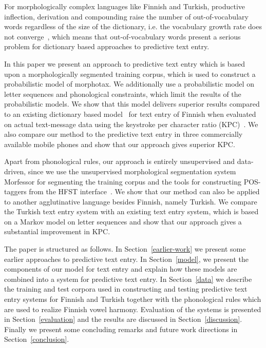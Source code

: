 \documentclass{llncs}
\begin{document}
For morphologically complex languages like Finnish and Turkish,
productive inflection, derivation and compounding raise the number of
out-of-vocabulary words regardless of the size of the dictionary,
i.e. the vocabulary growth rate does not
converge~\cite{Creutz_morph-basedspeech}, which means that
out-of-vocabulary words present a serious problem for dictionary based
approaches to predictive text entry.

In this paper we present an approach to predictive text entry which is
based upon a morphologically segmented training corpus, which is used
to construct a probabilistic model of morphotax. We additionally use a
probabilistic model on letter sequences and phonological constraints,
which limit the results of the probabilistic models. We show that this
model delivers superior results compared to an existing dictionary
based model~\cite{silfverberg/2011/cla} for text entry of Finnish when
evaluated on actual text-message data using the keystroke per
character ratio (KPC)~\cite{MacKenzie02kspc}. We also compare our
method to the predictive text entry in three commercially available
mobile phones and show that our approach gives superior KPC.

Apart from phonological rules, our approach is entirely unsupervised
and data-driven, since we use the unsupervised morphological
segmentation system Morfessor \cite{Creutz07ACMTSLP} for segmenting
the training corpus and the tools for constructing POS-taggers from
the HFST interface~\cite{hfst/2011}. We show that our method can also
be applied to another agglutinative language besides Finnish, namely
Turkish. We compare the Turkish text entry system with an existing
text entry system, which is based on a Markov model on letter
sequences and show that our approach gives a substantial improvement
in KPC.

The paper is structured as follows. In Section~\ref{earlier-work} we
present some earlier approaches to predictive text entry. In
Section~\ref{model}, we present the components of our model for text
entry and explain how these models are combined into a system for
predictive text entry.  In Section~\ref{data} we describe the
training and test corpora used in constructing and testing predictive
text entry systems for Finnish and Turkish together with the
phonological rules which are used to realize Finnish vowel
harmony. Evaluation of the systems is presented in
Section~\ref{evaluation} and the results are discussed in
Section~\ref{discussion}. Finally we present some concluding remarks
and future work directions in Section~\ref{conclusion}.
\end{document}
